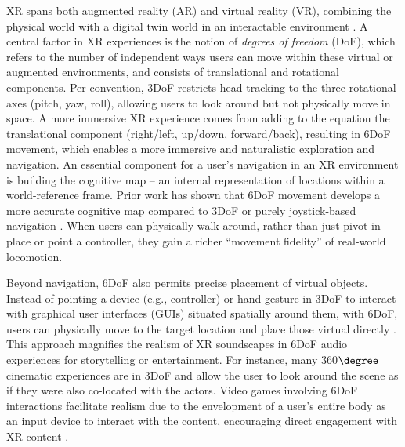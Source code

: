 XR spans both augmented reality (AR) and virtual reality (VR), combining the physical world with a digital twin world in an interactable environment \cite{milgram1995augmented}. A central factor in XR experiences is the notion of \emph{degrees of freedom} (DoF), which refers to the number of independent ways users can move within these virtual or augmented environments, and consists of translational and rotational components. Per convention, 3DoF restricts head tracking to the three rotational axes (pitch, yaw, roll), allowing users to look around but not physically move in space. A more immersive XR experience comes from adding to the equation the translational component (right/left, up/down, forward/back), resulting in 6DoF movement, which enables a more immersive and naturalistic exploration and navigation. An essential component for a user's navigation in an XR environment is building the cognitive map -- an internal representation of locations within a world-reference frame. Prior work has shown that 6DoF movement develops a more accurate cognitive map compared to 3DoF or purely joystick-based navigation \cite{walking2011, Pastor2024}. When users can physically walk around, rather than just pivot in place or point a controller, they gain a richer \enquote{movement fidelity} of real-world locomotion. 

Beyond navigation, 6DoF also permits precise placement of virtual objects. Instead of pointing a device (e.g., controller) or hand gesture in 3DoF to interact with graphical user interfaces (GUIs) situated spatially around them, with 6DoF, users can physically move to the target location and place those virtual directly \cite{kari2023scene}. This approach magnifies the realism of XR soundscapes in 6DoF audio experiences for storytelling or entertainment. 
For instance, many 360$\degree$ cinematic experiences are in 3DoF and allow the user to look around the scene as if they were also co-located with the actors. Video games involving 6DoF interactions facilitate realism due to the envelopment of a user's entire body as an input device to interact with the content, encouraging direct engagement with XR content \cite{belonging2024}.  

